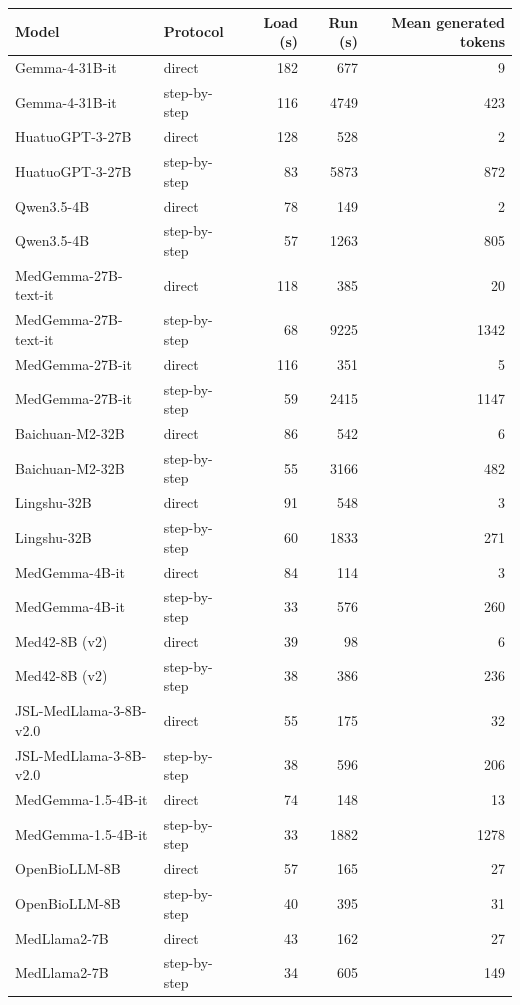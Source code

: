 \begin{tabular}{@{}llrrr@{}}
\toprule
Model & Protocol & Load (s) & Run (s) & Mean generated tokens \\
\midrule
Gemma-4-31B-it & direct & 182 & 677 & 9 \\
Gemma-4-31B-it & step-by-step & 116 & 4749 & 423 \\
HuatuoGPT-3-27B & direct & 128 & 528 & 2 \\
HuatuoGPT-3-27B & step-by-step & 83 & 5873 & 872 \\
Qwen3.5-4B & direct & 78 & 149 & 2 \\
Qwen3.5-4B & step-by-step & 57 & 1263 & 805 \\
MedGemma-27B-text-it & direct & 118 & 385 & 20 \\
MedGemma-27B-text-it & step-by-step & 68 & 9225 & 1342 \\
MedGemma-27B-it & direct & 116 & 351 & 5 \\
MedGemma-27B-it & step-by-step & 59 & 2415 & 1147 \\
Baichuan-M2-32B & direct & 86 & 542 & 6 \\
Baichuan-M2-32B & step-by-step & 55 & 3166 & 482 \\
Lingshu-32B & direct & 91 & 548 & 3 \\
Lingshu-32B & step-by-step & 60 & 1833 & 271 \\
MedGemma-4B-it & direct & 84 & 114 & 3 \\
MedGemma-4B-it & step-by-step & 33 & 576 & 260 \\
Med42-8B (v2) & direct & 39 & 98 & 6 \\
Med42-8B (v2) & step-by-step & 38 & 386 & 236 \\
JSL-MedLlama-3-8B-v2.0 & direct & 55 & 175 & 32 \\
JSL-MedLlama-3-8B-v2.0 & step-by-step & 38 & 596 & 206 \\
MedGemma-1.5-4B-it & direct & 74 & 148 & 13 \\
MedGemma-1.5-4B-it & step-by-step & 33 & 1882 & 1278 \\
OpenBioLLM-8B & direct & 57 & 165 & 27 \\
OpenBioLLM-8B & step-by-step & 40 & 395 & 31 \\
MedLlama2-7B & direct & 43 & 162 & 27 \\
MedLlama2-7B & step-by-step & 34 & 605 & 149 \\
\bottomrule
\end{tabular}
